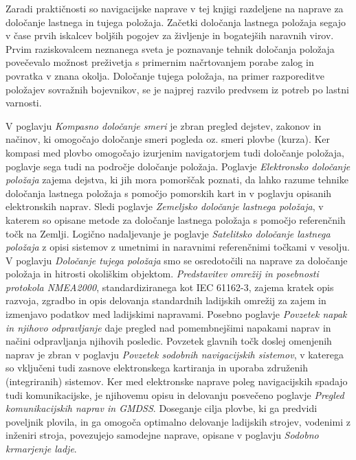 Zaradi praktičnosti so navigacijske naprave v tej knjigi razdeljene na naprave za določanje lastnega in tujega položaja. Začetki določanja lastnega položaja segajo v čase prvih iskalcev boljših pogojev za življenje in bogatejših naravnih virov. Prvim raziskovalcem neznanega sveta je poznavanje tehnik določanja položaja povečevalo možnost preživetja s primernim načrtovanjem porabe zalog in povratka v znana okolja. Določanje tujega položaja, na primer razporeditve položajev sovražnih bojevnikov, se je najprej razvilo predvsem iz potreb po lastni varnosti.

V poglavju \textit{Kompasno določanje smeri} je zbran pregled dejstev, zakonov in načinov, ki omogočajo določanje smeri pogleda oz. smeri plovbe (kurza). Ker kompasi med plovbo omogočajo izurjenim navigatorjem tudi določanje položaja, poglavje sega tudi na področje določanje položaja. Poglavje \textit{Elektronsko določanje položaja} zajema dejstva, ki jih mora pomorščak poznati, da lahko razume tehnike določanja lastnega položaja s pomočjo pomorskih kart in v poglavju opisanih elektronskih naprav. Sledi poglavje \textit{Zemeljsko določanje lastnega položaja}, v katerem so opisane metode za določanje lastnega položaja s pomočjo referenčnih točk na Zemlji. Logično nadaljevanje je poglavje \textit{Satelitsko določanje lastnega položaja} z opisi sistemov z umetnimi in naravnimi referenčnimi točkami v vesolju. V poglavju \textit{Določanje tujega položaja} smo se osredotočili na naprave za določanje položaja in hitrosti okoliškim objektom. \textit{Predstavitev omrežij in posebnosti protokola NMEA2000}, standardiziranega kot IEC 61162-3, zajema kratek opis razvoja, zgradbo in opis delovanja standardnih ladijskih omrežij za zajem in izmenjavo podatkov med ladijskimi napravami. Posebno poglavje \textit{Povzetek napak in njihovo odpravljanje} daje pregled nad pomembnejšimi napakami naprav in načini odpravljanja njihovih posledic. Povzetek glavnih točk doslej omenjenih naprav je zbran v poglavju \textit{Povzetek sodobnih navigacijskih sistemov}, v katerega so vključeni tudi zasnove elektronskega kartiranja in uporaba združenih (integriranih) sistemov. Ker med elektronske naprave poleg navigacijskih spadajo tudi komunikacijske, je njihovemu opisu in delovanju posvečeno poglavje \textit{Pregled komunikacijskih naprav in GMDSS}. Doseganje cilja plovbe, ki ga predvidi poveljnik plovila, in ga omogoča optimalno delovanje ladijskih strojev, vodenimi z inženiri stroja, povezujejo samodejne naprave, opisane v poglavju \textit{Sodobno krmarjenje ladje}.      

